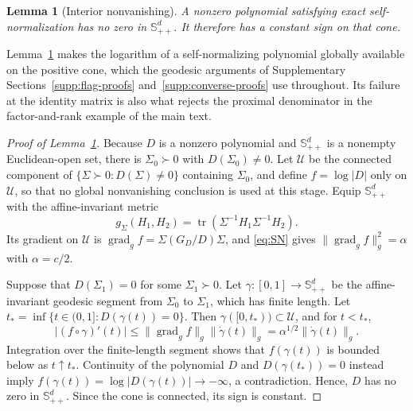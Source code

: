 \documentclass[12pt,a4paper]{article}
\theoremstyle{plain}
\newtheorem{lemma}{Lemma}
\theoremstyle{definition}
\newcommand{\Smat}{\mathbb{S}}
\newcommand{\tr}{\operatorname{tr}}
\begin{document}
\begin{lemma}[Interior nonvanishing]
\label{lem:nozero}
    A nonzero polynomial satisfying exact self-normalization has no zero in $\Smat^d_{++}$.
    It therefore has a constant sign on that cone.
\end{lemma}

Lemma~\ref{lem:nozero} makes the logarithm of a self-normalizing polynomial globally available on the positive cone, which the geodesic arguments of Supplementary Sections~\ref{supp:flag-proofs} and~\ref{supp:converse-proofs} use throughout.
Its failure at the identity matrix is also what rejects the proximal denominator in the factor-and-rank example of the main text.

\begin{proof}[Proof of Lemma~\ref{lem:nozero}]
    Because $D$ is a nonzero polynomial and $\Smat^d_{++}$ is a nonempty Euclidean-open set, there is $\Sigma_0\succ0$ with $D(\Sigma_0)\neq0$.
    Let $\mathcal{U}$ be the connected component of $\{\Sigma\succ0:D(\Sigma)\neq0\}$ containing $\Sigma_0$, and define $f=\log|D|$ only on $\mathcal{U}$, so that no global nonvanishing conclusion is used at this stage.
    Equip $\Smat^d_{++}$ with the affine-invariant metric
    \begin{equation*}
        g_\Sigma(H_1,H_2)
        =
        \tr(\Sigma^{-1}H_1\Sigma^{-1}H_2)
        .
    \end{equation*}
    Its gradient on $\mathcal{U}$ is $\operatorname{grad}_g f=\Sigma(G_D/D)\Sigma$, and \eqref{eq:SN} gives $\lVert\operatorname{grad}_g f\rVert_g^2=\alpha$ with $\alpha=c/2$.
    
    Suppose that $D(\Sigma_1)=0$ for some $\Sigma_1\succ0$.
    Let $\gamma:[0,1]\to\Smat^d_{++}$ be the affine-invariant geodesic segment from $\Sigma_0$ to $\Sigma_1$, which has finite length.
    Let $t_\ast=\inf\{t\in(0,1]:D(\gamma(t))=0\}$.
    Then $\gamma([0,t_\ast))\subset\mathcal{U}$, and for $t<t_\ast$,
    \begin{equation*}
        |(f\circ\gamma)'(t)|
        \le\lVert\operatorname{grad}_g f\rVert_g
        \lVert\dot\gamma(t)\rVert_g
        =
        \alpha^{1/2}\lVert\dot\gamma(t)\rVert_g
        .
    \end{equation*}
    Integration over the finite-length segment shows that $f(\gamma(t))$ is bounded below as $t\uparrow t_\ast$.
    Continuity of the polynomial $D$ and $D(\gamma(t_\ast))=0$ instead imply $f(\gamma(t))=\log|D(\gamma(t))|\to-\infty$, a contradiction.
    Hence, $D$ has no zero in $\Smat^d_{++}$.
    Since the cone is connected, its sign is constant.
\end{proof}
\end{document}
